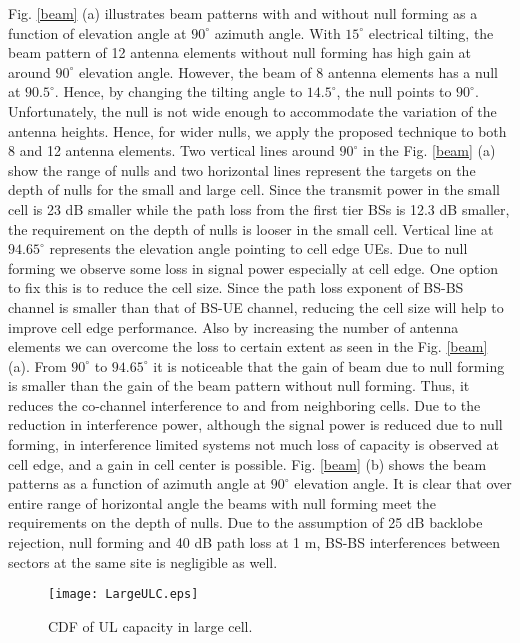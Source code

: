 \documentclass[twocolumn]{IEEEtran}
\begin{document}
Fig. \ref{beam} (a) illustrates beam patterns with and without null
forming as a function of elevation angle at $90^\circ$ azimuth
angle. With $15^\circ$ electrical tilting, the beam pattern of 12
antenna elements without null forming has high gain at around
$90^\circ$ elevation angle. However, the beam of 8 antenna elements
has a null at $90.5^\circ$. Hence, by changing the tilting angle to
$14.5^\circ$, the null points to $90^\circ$. Unfortunately, the null
is not wide enough to accommodate the variation of the antenna
heights. Hence, for wider nulls, we apply the proposed technique to
both 8 and 12 antenna elements. Two vertical lines around $90^\circ$
in the Fig. \ref{beam} (a) show the range of nulls and two
horizontal lines represent the targets on the depth of nulls for the
small and large cell. Since the transmit power in the small cell is
23 dB smaller while the path loss from the first tier BSs is 12.3 dB
smaller, the requirement on the depth of nulls is looser in the
small cell. Vertical line at $94.65^\circ$ represents the elevation
angle pointing to cell edge UEs. Due to null forming we observe some
loss in signal power especially at cell edge. One option to fix this
is to reduce the cell size. Since the path loss exponent of BS-BS
channel is smaller than that of BS-UE channel, reducing the cell
size will help to improve cell edge performance. Also by increasing
the number of antenna elements we can overcome the loss to certain
extent as seen in the Fig. \ref{beam} (a). From $90^\circ$ to
$94.65^\circ$ it is noticeable that the gain of beam due to null
forming is smaller than the gain of the beam pattern without null
forming. Thus, it reduces the co-channel interference to and from
neighboring cells. Due to the reduction in interference power,
although the signal power is reduced due to null forming, in
interference limited systems not much loss of capacity is observed
at cell edge, and a gain in cell center is possible. Fig. \ref{beam}
(b) shows the beam patterns as a function of azimuth angle at
$90^\circ$ elevation angle. It is clear that over entire range of
horizontal angle the beams with null forming meet the requirements
on the depth of nulls. Due to the assumption of 25 dB backlobe
rejection, null forming and 40 dB path loss at 1 m, BS-BS
interferences between sectors at the same site is negligible as
well.

\begin{figure}[!t]

\centering
    {\texttt{[image: LargeULC.eps]}}

\caption{CDF of UL capacity in large cell. \label{BSBSLarge} }

\end{figure}
\end{document}
